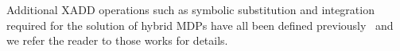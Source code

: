 Additional XADD operations such as symbolic substitution and
integration required for the solution of hybrid MDPs have all been
defined previously~\cite{sanner_uai11,zamani12} and we refer the
reader to those works for details.

